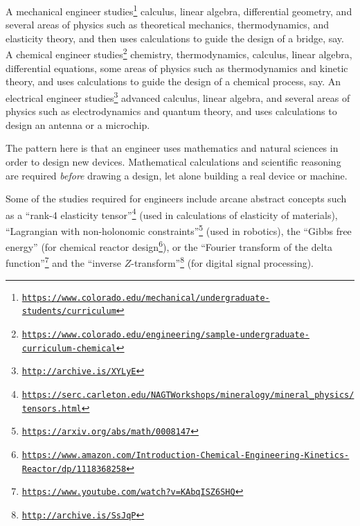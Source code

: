 A mechanical engineer studies\footnote{\texttt{\href{https://www.colorado.edu/mechanical/undergraduate-students/curriculum}{https://www.colorado.edu/mechanical/undergraduate-students/curriculum}}}
calculus, linear algebra, differential geometry, and several areas
of physics such as theoretical mechanics, thermodynamics, and elasticity
theory, and then uses calculations to guide the design of a bridge,
say. A chemical engineer studies\footnote{\texttt{\href{https://www.colorado.edu/engineering/sample-undergraduate-curriculum-chemical}{https://www.colorado.edu/engineering/sample-undergraduate-curriculum-chemical}}}
chemistry, thermodynamics, calculus, linear algebra, differential
equations, some areas of physics such as thermodynamics and kinetic
theory, and uses calculations to guide the design of a chemical process,
say. An electrical engineer studies\footnote{\texttt{\href{http://archive.is/XYLyE}{http://archive.is/XYLyE}}}
advanced calculus, linear algebra, and several areas of physics such
as electrodynamics and quantum theory, and uses calculations to design
an antenna or a microchip.

The pattern here is that an engineer uses mathematics and natural
sciences in order to design new devices. Mathematical calculations
and scientific reasoning are required \emph{before} drawing a design,
let alone building a real device or machine.

Some of the studies required for engineers include arcane abstract
concepts such as a \textsf{``}rank-4 elasticity tensor\textsf{''}\footnote{\texttt{\href{https://serc.carleton.edu/NAGTWorkshops/mineralogy/mineral_physics/tensors.html}{https://serc.carleton.edu/NAGTWorkshops/mineralogy/mineral\_physics/tensors.html}}}
(used in calculations of elasticity of materials), \textsf{``}Lagrangian with
non-holonomic constraints\textsf{''}\footnote{\texttt{\href{https://arxiv.org/abs/math/0008147}{https://arxiv.org/abs/math/0008147}}}
(used in robotics), the \textsf{``}Gibbs free energy\textsf{''} (for chemical reactor
design\footnote{\texttt{\href{https://www.amazon.com/Introduction-Chemical-Engineering-Kinetics-Reactor/dp/1118368258}{https://www.amazon.com/Introduction-Chemical-Engineering-Kinetics-Reactor/dp/1118368258}}}),
or the \textsf{``}Fourier transform of the delta function\textsf{''}\footnote{\texttt{\href{https://www.youtube.com/watch?v=KAbqISZ6SHQ}{https://www.youtube.com/watch?v=KAbqISZ6SHQ}}}
and the \textsf{``}inverse $Z$-transform\textsf{''}\footnote{\texttt{\href{http://archive.is/SsJqP}{http://archive.is/SsJqP}}}
(for digital signal processing).

